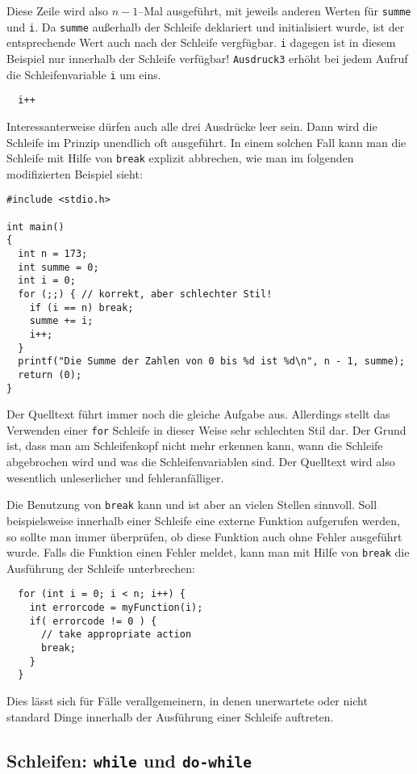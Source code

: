 Diese Zeile wird also $n-1$--Mal ausgeführt, mit jeweils anderen Werten für \verb|summe| und \verb|i|.
Da \verb|summe| außerhalb der Schleife deklariert und initialisiert wurde, ist der entsprechende Wert auch nach der Schleife vergfügbar.
\verb|i| dagegen ist in diesem Beispiel nur innerhalb der Schleife verfügbar!
\texttt{Ausdruck3} erhöht bei jedem Aufruf die Schleifenvariable \verb|i| um eins.
\begin{lstlisting}
  i++
\end{lstlisting}
Interessanterweise dürfen auch alle drei Ausdrücke leer sein.
Dann wird die Schleife im Prinzip unendlich oft ausgeführt.
In einem solchen Fall kann man die Schleife mit Hilfe von \verb|break| explizit abbrechen, wie man im folgenden modifizierten Beispiel sieht:
\begin{lstlisting}
#include <stdio.h>

int main()
{
  int n = 173;
  int summe = 0;
  int i = 0;
  for (;;) { // korrekt, aber schlechter Stil!
    if (i == n) break;
    summe += i;
    i++;
  }
  printf("Die Summe der Zahlen von 0 bis %d ist %d\n", n - 1, summe);
  return (0);
}
\end{lstlisting}
Der Quelltext führt immer noch die gleiche Aufgabe aus. 
Allerdings stellt das Verwenden einer \texttt{for} Schleife in dieser Weise sehr schlechten Stil dar.
Der Grund ist, dass man am Schleifenkopf nicht mehr erkennen kann, wann die Schleife abgebrochen wird und was die Schleifenvariablen sind.
Der Quelltext wird also wesentlich unleserlicher und fehleranfälliger.

Die Benutzung von \verb|break| kann und ist aber an vielen Stellen sinnvoll.
Soll beispielsweise innerhalb einer Schleife eine externe Funktion aufgerufen werden, so sollte man immer überprüfen, ob diese Funktion auch ohne Fehler ausgeführt wurde.
Falls die Funktion einen Fehler meldet, kann man mit Hilfe von \verb|break| die Ausführung der Schleife unterbrechen:
\begin{lstlisting}
  for (int i = 0; i < n; i++) {
    int errorcode = myFunction(i);
    if( errorcode != 0 ) {
      // take appropriate action
      break;
    }
  }
\end{lstlisting}
Dies lässt sich für Fälle verallgemeinern, in denen unerwartete oder nicht standard Dinge innerhalb der Ausführung einer Schleife auftreten.

\subsection{Schleifen: \texttt{while} und \texttt{do-while}}

